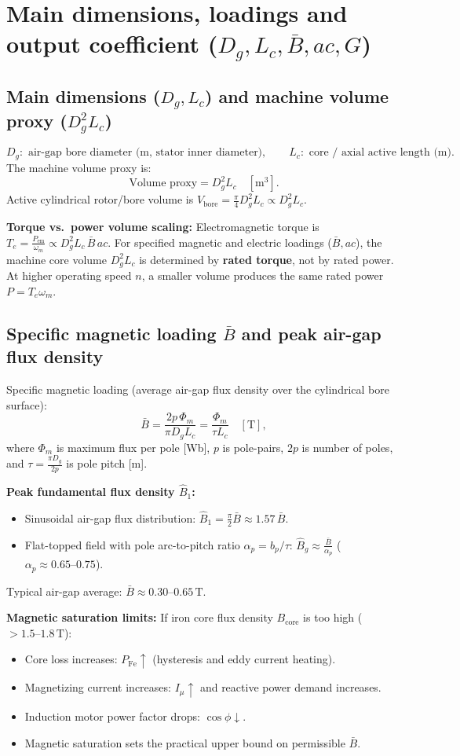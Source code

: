 \section{Main dimensions, loadings and output coefficient ($D_g, L_c, \bar{B}, ac, G$)}

\subsection{Main dimensions ($D_g, L_c$) and machine volume proxy ($D_g^2 L_c$)}
\[
D_g:\text{ air-gap bore diameter (m, stator inner diameter)},
\qquad
L_c:\text{ core / axial active length (m)}.
\]
The machine volume proxy is:
\[
\boxed{\text{Volume proxy} = D_g^2 L_c}\quad[\mathrm{m^3}].
\]
Active cylindrical rotor/bore volume is $V_{\mathrm{bore}} = \frac{\pi}{4} D_g^2 L_c \propto D_g^2 L_c$.

\textbf{Torque vs.\ power volume scaling:}
Electromagnetic torque is $T_e = \frac{P_{\mathrm{em}}}{\omega_m} \propto D_g^2 L_c\,\bar{B}\,ac$.
For specified magnetic and electric loadings ($\bar{B}, ac$), the machine core volume $D_g^2 L_c$ is determined by \textbf{rated torque}, not by rated power.
At higher operating speed $n$, a smaller volume produces the same rated power $P = T_e \omega_m$.

\subsection{Specific magnetic loading $\bar{B}$ and peak air-gap flux density}
Specific magnetic loading (average air-gap flux density over the cylindrical bore surface):
\[
\boxed{\bar{B} = \frac{2p\,\Phi_m}{\pi D_g L_c} = \frac{\Phi_m}{\tau L_c}}\quad[\mathrm{T}],
\]
where $\Phi_m$ is maximum flux per pole [Wb], $p$ is pole-pairs, $2p$ is number of poles, and $\tau = \frac{\pi D_g}{2p}$ is pole pitch [m].

\textbf{Peak fundamental flux density $\hat{B}_1$:}
\begin{itemize}
  \item Sinusoidal air-gap flux distribution: $\hat{B}_1 = \frac{\pi}{2}\bar{B} \approx 1.57\,\bar{B}$.
  \item Flat-topped field with pole arc-to-pitch ratio $\alpha_p = b_p/\tau$: $\hat{B}_g \approx \frac{\bar{B}}{\alpha_p}$ ($\alpha_p \approx 0.65\text{--}0.75$).
\end{itemize}
Typical air-gap average: $\bar{B} \approx 0.30\text{--}0.65\,\mathrm{T}$.

\textbf{Magnetic saturation limits:}
If iron core flux density $B_{\mathrm{core}}$ is too high ($>1.5\text{--}1.8\,\mathrm{T}$):
\begin{itemize}
  \item Core loss increases: $P_{\mathrm{Fe}} \uparrow$ (hysteresis and eddy current heating).
  \item Magnetizing current increases: $I_\mu \uparrow$ and reactive power demand increases.
  \item Induction motor power factor drops: $\cos\phi \downarrow$.
  \item Magnetic saturation sets the practical upper bound on permissible $\bar{B}$.
\end{itemize}

